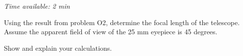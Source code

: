 \emph{Time available: 2 min}

Using the result from problem O2, determine the focal length of the
telescope. Assume the apparent field of view of the 25 mm eyepiece is 45
degrees.

Show and explain your calculations.
